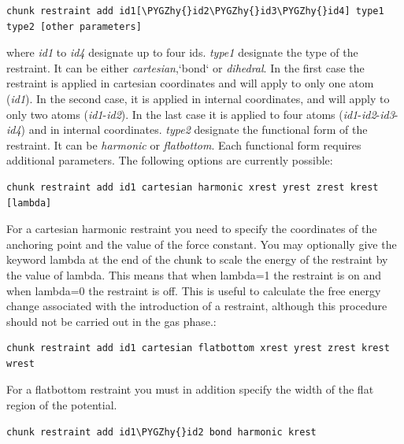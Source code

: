 \documentclass[letterpaper,10pt,english]{sphinxmanual}
\def\PYGZhy{\char`\-}
\begin{document}
\begin{Verbatim}[commandchars=\\\{\}]
chunk restraint add id1[\PYGZhy{}id2\PYGZhy{}id3\PYGZhy{}id4] type1 type2 [other parameters]
\end{Verbatim}

where \emph{id1} to \emph{id4} designate up to four ids. \emph{type1} designate the type of the restraint. It can be either \emph{cartesian},{}`bond{}` or \emph{dihedral}. In the first case the restraint is applied in cartesian coordinates and will apply to only one atom (\emph{id1}). In the second case, it is applied in internal coordinates, and will apply to only two atoms (\emph{id1}-\emph{id2}). In the last case it is applied to four atoms (\emph{id1}-\emph{id2}-\emph{id3}-\emph{id4}) and in internal coordinates. \emph{type2} designate the functional form of the restraint. It can be \emph{harmonic} or \emph{flatbottom}. Each functional form requires additional parameters. The following options are currently possible:

\begin{Verbatim}[commandchars=\\\{\}]
chunk restraint add id1 cartesian harmonic xrest yrest zrest krest [lambda]
\end{Verbatim}

For a cartesian harmonic restraint you need to specify the coordinates of the anchoring point and the value of the force constant. You may optionally give the keyword lambda at the end of the chunk to scale the energy of the restraint by the value of lambda. This means that when lambda=1 the restraint is on and when lambda=0 the restraint is off. This is useful to calculate the free energy change associated with the introduction of a restraint, although this procedure should not be carried out in the gas phase.:

\begin{Verbatim}[commandchars=\\\{\}]
chunk restraint add id1 cartesian flatbottom xrest yrest zrest krest wrest
\end{Verbatim}

For a flatbottom restraint you must in addition specify the width of the flat region of the potential.

\begin{Verbatim}[commandchars=\\\{\}]
chunk restraint add id1\PYGZhy{}id2 bond harmonic krest
\end{Verbatim}
\end{document}
